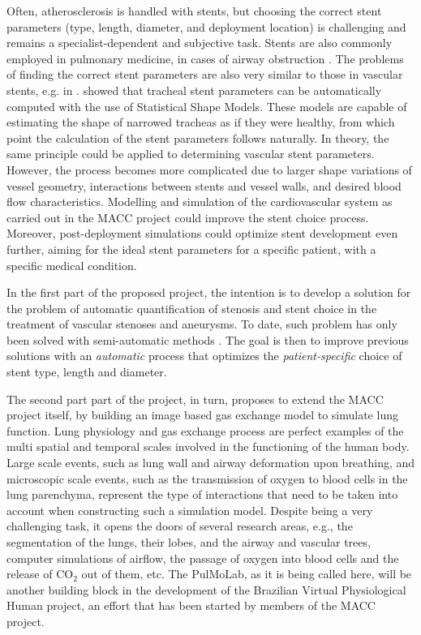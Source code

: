 Often, atherosclerosis is handled with stents, but choosing the correct stent parameters (type, length, diameter, and deployment location) is challenging and remains a specialist-dependent and subjective task. Stents are also commonly employed in pulmonary medicine, in cases of airway obstruction \citep{Chin,Freitag1,Freitag2,Freitag3,LeeP,Saito,Venuta}. The problems of finding the correct stent parameters are also very similar to those in vascular stents, e.g. in \citep{Bemmel}. \citet{Pinho:Trachea4} showed that tracheal stent parameters can be automatically computed with the use of Statistical Shape Models. These models are capable of estimating the shape of narrowed tracheas as if they were healthy, from which point the calculation of the stent parameters follows naturally. In theory, the same principle could be applied to determining vascular stent parameters. However, the process becomes more complicated due to larger shape variations of vessel geometry, interactions between stents and vessel walls, and desired blood flow characteristics. Modelling and simulation of the cardiovascular system as carried out in the MACC project could improve the stent choice process. Moreover, post-deployment simulations could optimize stent development even further, aiming for the ideal stent parameters for a specific patient, with a specific medical condition. 

In the first part of the proposed project, the intention is to develop a solution for the problem of automatic quantification of stenosis and stent choice in the treatment of vascular stenoses and aneurysms. To date, such problem has only been solved with semi-automatic methods \citep{Gremse01092011,Scherl200721,HERN-06b,Bemmel}. The goal is then to improve previous solutions with an {\em automatic} process that optimizes the {\em patient-specific} choice of stent type, length and diameter. 

The second part part of the project, in turn, proposes to extend the MACC project itself, by building an image based gas exchange model to simulate lung function. Lung physiology and gas exchange process are perfect examples of the multi spatial and temporal scales involved in the functioning of the human body. Large scale events, such as lung wall and airway deformation upon breathing, and microscopic scale events, such as the transmission of oxygen to blood cells in the lung parenchyma, represent the type of interactions that need to be taken into account when constructing such a simulation model. Despite being a very challenging task, it opens the doors of several research areas, e.g., the segmentation of the lungs, their lobes, and the airway and vascular trees, computer simulations of airflow, the passage of oxygen into blood cells and the release of CO$_2$ out of them, etc. The PulMoLab, as it is being called here, will be another building block in the development of the Brazilian Virtual Physiological Human project, an effort that has been started by members of the MACC project. 

